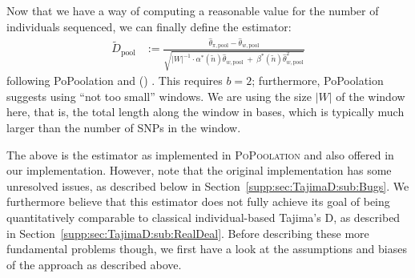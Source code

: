 \documentclass[a4paper,fontsize=9pt,DIV=14]{scrartcl}
\newcounter{todo}
\newcommand\todo[1]{}
\newcommand\citeay[1]{\citeauthor{#1} (\citeyear{#1}) \cite{#1}}
\newcommand\toolname{\textsc}
\newcommand\secref[1]{Section~\ref{#1}}
\begin{document}
Now that we have a way of computing a reasonable value for the number of individuals sequenced,
we can finally define the estimator:
%
\begin{align}
    \tilde{D}_\text{pool} &:=
    \frac{
        \widehat{\theta}_{\pi, \text{pool}} - \widehat{\theta}_{w, \text{pool}}
            }{
        \sqrt{ {|W|}^{-1} \cdot \alpha^*(\tilde{n}) \widehat{\theta}_{w, \text{pool}} ~+~ \beta^*(\tilde{n}) \widehat{\theta}_{w, \text{pool}}^2 }
    }
\end{align}
%
following PoPoolation and \citeay{Achaz2008}.
This requires $b=2$; furthermore, PoPoolation suggests using ``not too small'' windows.
We are using the size $|W|$ of the window here, that is, the total length along the window in bases, which is typically much larger than the number of SNPs in the window. 

\todo{UNRESOLVED ISSUE: That is what i get from their code. Is that the correct term to use here? should it be the number of SNPs in the window instead?  JPS: I have no idea.  I would need to go through the Achaz paper in some detail to figure it out.  My guess is number of SNPs is right.}

The above is the estimator as implemented in \toolname{PoPoolation} and also offered in our implementation. However, note that the original implementation has some unresolved issues, as described below in \secref{supp:sec:TajimaD:sub:Bugs}. We furthermore believe that this estimator does not fully achieve its goal of being quantitatively comparable to classical individual-based Tajima's D, as described in \secref{supp:sec:TajimaD:sub:RealDeal}.
Before describing these more fundamental problems though, we first have a look at the assumptions and biases of the approach as described above.


\end{document}
